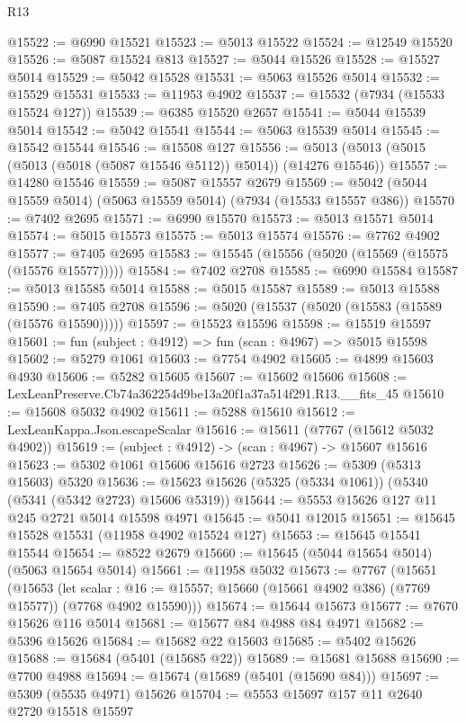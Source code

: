 \begin{lexlean}{R13}
\begin{coremodule}
@15522 := @6990 @15521
@15523 := @5013 @15522
@15524 := @12549 @15520
@15526 := @5087 @15524 @813
@15527 := @5044 @15526
@15528 := @15527 @5014
@15529 := @5042 @15528
@15531 := @5063 @15526 @5014
@15532 := @15529 @15531
@15533 := @11953 @4902
@15537 := @15532 (@7934 (@15533 @15524 @127))
@15539 := @6385 @15520 @2657
@15541 := @5044 @15539 @5014
@15542 := @5042 @15541
@15544 := @5063 @15539 @5014
@15545 := @15542 @15544
@15546 := @15508 @127
@15556 := @5013 (@5013 (@5015 (@5013 (@5018 (@5087 @15546 @5112)) @5014)) (@14276 @15546))
@15557 := @14280 @15546
@15559 := @5087 @15557 @2679
@15569 := @5042 (@5044 @15559 @5014) (@5063 @15559 @5014) (@7934 (@15533 @15557 @386))
@15570 := @7402 @2695
@15571 := @6990 @15570
@15573 := @5013 @15571 @5014
@15574 := @5015 @15573
@15575 := @5013 @15574
@15576 := @7762 @4902
@15577 := @7405 @2695
@15583 := @15545 (@15556 (@5020 (@15569 (@15575 (@15576 @15577)))))
@15584 := @7402 @2708
@15585 := @6990 @15584
@15587 := @5013 @15585 @5014
@15588 := @5015 @15587
@15589 := @5013 @15588
@15590 := @7405 @2708
@15596 := @5020 (@15537 (@5020 (@15583 (@15589 (@15576 @15590)))))
@15597 := @15523 @15596
@15598 := @15519 @15597
@15601 := fun (subject : @4912) => fun (scan : @4967) => @5015 @15598
@15602 := @5279 @1061
@15603 := @7754 @4902
@15605 := @4899 @15603 @4930
@15606 := @5282 @15605
@15607 := @15602 @15606
@15608 := LexLeanPreserve.Cb74a362254d9be13a20f1a37a514f291.R13.__fits_45
@15610 := @15608 @5032 @4902
@15611 := @5288 @15610
@15612 := LexLeanKappa.Json.escapeScalar
@15616 := @15611 (@7767 (@15612 @5032 @4902))
@15619 := (subject : @4912) -> (scan : @4967) -> @15607 @15616
@15623 := @5302 @1061 @15606 @15616 @2723
@15626 := @5309 (@5313 @15603) @5320
@15636 := @15623 @15626 (@5325 (@5334 @1061)) (@5340 (@5341 (@5342 @2723) @15606 @5319))
@15644 := @5553 @15626 @127 @11 @245 @2721 @5014 @15598 @4971
@15645 := @5041 @12015
@15651 := @15645 @15528 @15531 (@11958 @4902 @15524 @127)
@15653 := @15645 @15541 @15544
@15654 := @8522 @2679
@15660 := @15645 (@5044 @15654 @5014) (@5063 @15654 @5014)
@15661 := @11958 @5032
@15673 := @7767
    (@15651
      (@15653
        (let scalar : @16 := @15557; @15660 (@15661 @4902 @386) (@7769 @15577))
        (@7768 @4902 @15590)))
@15674 := @15644 @15673
@15677 := @7670 @15626 @116 @5014
@15681 := @15677 @84 @4988 @84 @4971
@15682 := @5396 @15626
@15684 := @15682 @22 @15603
@15685 := @5402 @15626
@15688 := @15684 (@5401 (@15685 @22))
@15689 := @15681 @15688
@15690 := @7700 @4988
@15694 := @15674 (@15689 (@5401 (@15690 @84)))
@15697 := @5309 (@5535 @4971) @15626
@15704 := @5553 @15697 @157 @11 @2640 @2720 @15518 @15597

\end{coremodule}
\end{lexlean}
